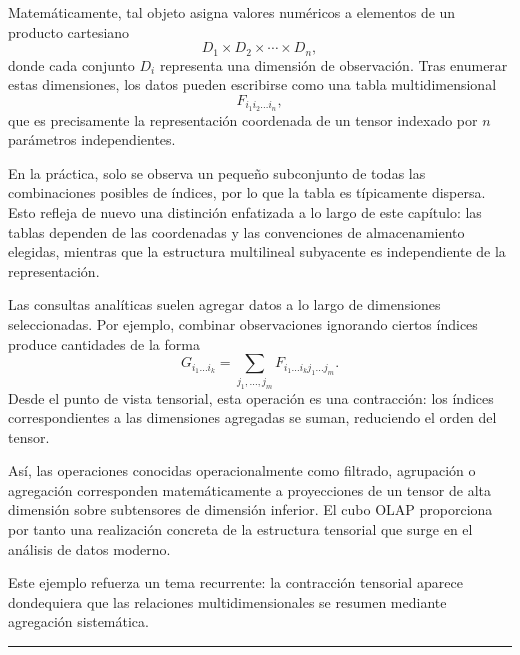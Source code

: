 \medskip

Matemáticamente, tal objeto asigna valores numéricos a elementos de un
producto cartesiano
\[
D_1 \times D_2 \times \cdots \times D_n,
\]
donde cada conjunto $D_i$ representa una dimensión de observación.
Tras enumerar estas dimensiones, los datos pueden escribirse como una tabla
multidimensional
\[
F_{i_1 i_2 \dots i_n},
\]
que es precisamente la representación coordenada de un tensor indexado por
$n$ parámetros independientes.

\medskip

En la práctica, solo se observa un pequeño subconjunto de todas las
combinaciones posibles de índices, por lo que la tabla es típicamente dispersa.
Esto refleja de nuevo una distinción enfatizada a lo largo de este capítulo:
las tablas dependen de las coordenadas y las convenciones de almacenamiento
elegidas, mientras que la estructura multilineal subyacente es independiente
de la representación.

\medskip

Las consultas analíticas suelen agregar datos a lo largo de dimensiones
seleccionadas.
Por ejemplo, combinar observaciones ignorando ciertos índices produce cantidades
de la forma
\[
G_{i_1 \dots i_k}
=
\sum_{j_1,\dots,j_m}
F_{i_1 \dots i_k j_1 \dots j_m}.
\]
Desde el punto de vista tensorial, esta operación es una contracción: los
índices correspondientes a las dimensiones agregadas se suman, reduciendo el
orden del tensor.

\medskip

Así, las operaciones conocidas operacionalmente como filtrado, agrupación o
agregación corresponden matemáticamente a proyecciones de un tensor de alta
dimensión sobre subtensores de dimensión inferior.
El cubo OLAP proporciona por tanto una realización concreta de la estructura
tensorial que surge en el análisis de datos moderno.

\medskip

Este ejemplo refuerza un tema recurrente: la contracción tensorial aparece
dondequiera que las relaciones multidimensionales se resumen mediante
agregación sistemática.

\medskip
\hrule
\bigskip